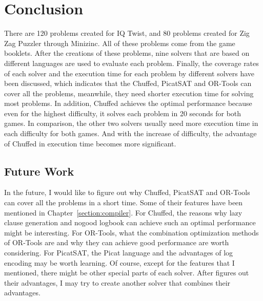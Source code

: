 \chapter{Conclusion}
\label{cha:conc}
There are 120 problems created for IQ Twist, and 80 problems created for Zig Zag Puzzler through Minizinc. All of these problems come from the game booklets. After the creations of these problems, nine solvers that are based on different languages are used to evaluate each problem. Finally, the coverage rates of each solver and the execution time for each problem by different solvers have been discussed, which indicates that the Chuffed, PicatSAT and OR-Tools can cover all the problems, meanwhile, they need shorter execution time for solving most problems. In addition, Chuffed achieves the optimal performance because even for the highest difficulty, it solves each problem in 20 seconds for both games. In comparison, the other two solvers usually need more execution time in each difficulty for both games. And with the increase of difficulty, the advantage of Chuffed in execution time becomes more significant. 
\section{Future Work}
\label{sec:future}
In the future, I would like to figure out why Chuffed, PicatSAT and OR-Tools can cover all the problems in a short time. Some of their features have been mentioned in Chapter~\ref{section:compiler}. 
For Chuffed, the reasons why lazy clause generation and nogood logbook can achieve such an optimal performance might be interesting. 
For OR-Tools, what the combination optimization methods of OR-Tools are and why they can achieve good performance are worth considering.
For PicatSAT, the Picat language and the advantages of log encoding may be worth learning.
Of course, except for the features that I mentioned, there might be other special parts of each solver. After figures out their advantages, I may try to create another solver that combines their advantages.



